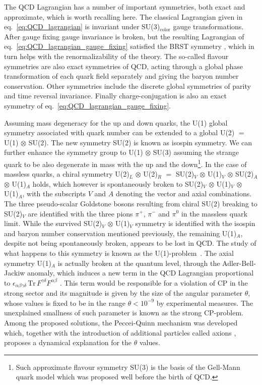 The QCD Lagrangian has a number of important symmetries, both exact and approximate,
which is worth recalling here.
The classical Lagrangian given in eq.~\eqref{eq:QCD_lagrangian} is invariant under SU(3)$_{\text{color}}$
gauge transformations. After gauge fixing gauge invariance is broken, but the resulting Lagrangian of 
eq.~\eqref{eq:QCD_lagrangian_gauge_fixing} satisfied the BRST symmetry \cite{Becchi:1975nq, Tyutin:1975qk},
which in turn helps with the renormalizability of the theory.
The so-called flavour symmetries are also exact symmetries of QCD, 
acting through a global phase transformation of each quark field separately and giving
the baryon number conservation. 
Other symmetries include the discrete global symmetries of parity and time reversal invariance.
Finally charge-conjugation is also an exact symmetry of eq.~\eqref{eq:QCD_lagrangian_gauge_fixing}. 

Assuming mass degeneracy for the up and down quarks, the U(1) global symmetry associated with quark number 
can be extended to a global U(2) $=$ U(1) $\otimes$ SU(2). The new symmetry SU(2) is known as isospin symmetry.
We can further enhance the symmetry group to U(1) $\otimes$ SU(3) assuming the strange quark to be also 
degenerate in mass with the up and the down\footnote{Such approximate flavour symmetry SU(3) is the basis of the Gell-Mann
quark model \cite{GellMann:1964nj} which was proposed well before the birth of QCD.}.
In the case of massless quarks, a chiral symmetry
U(2)$_{L}$ $\otimes$ U(2)$_R$ $=$ SU(2)$_V$ $\otimes$ U(1)$_V$ $\otimes$  SU(2)$_A$ $\otimes$ U(1)$_A$ 
holds, which however is spontaneously broken to SU(2)$_V$ $\otimes$ U(1)$_V$ $\otimes$ U(1)$_A$,
with the subscripts $V$ and $A$ denoting the vector and axial combinations.
The three pseudo-scalar Goldstone bosons resulting from chiral SU(2) breaking 
to SU(2)$_V$ are identified with the three pions $\pi^+$, $\pi^-$ and $\pi^0$
in the massless quark limit. 
While the survived SU(2)$_V$ $\otimes$ U(1)$_V$ symmetry is identified with the isospin and baryon number 
conservation mentioned previously, the remaining U(1)$_A$, despite not being spontaneously broken,
appears to be lost in QCD. The study of what happens to this symmetry is known as the U(1)-problem~\cite{Weinberg:1975ui}.
The axial symmetry U(1)$_A$ is actually broken at the quantum level, through the Adler-Bell-Jackiw anomaly,
which induces a new term in the QCD Lagrangian proportional to 
$\epsilon_{\alpha\beta\gamma\delta}\, \text{Tr}\, F^{\gamma\delta} F^{\alpha\beta}$ .
This term would be responsible for a violation of CP in the strong sector and 
its magnitude is given by the size of the angular parameter $\theta$, whose values is fixed to be in the range
$\theta<10^{-9}$ by experimental measures. The unexplained smallness of such parameter is known as the strong CP-problem.
Among the proposed solutions, the Peccei-Quinn mechanism was developed \cite{Peccei:1977ur} which,
together with the introduction of additional particles called axions \cite{PhysRevLett.40.223,PhysRevLett.40.279},
proposes a dynamical explanation for the $\theta$ values. 

